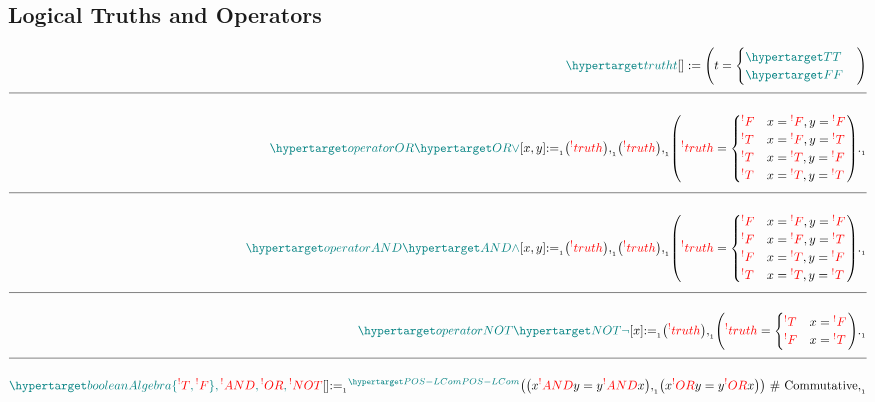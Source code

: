 \documentclass[a4paper]{article}
\makeatletter
\def\ml{\mleft}
\def\mr{\mright}
\newcommand{\defeq}{:=}
\newcommand{\eq}{=}
\newcommand{\cusand}{,}
\newcommand{\cusend}{.}
\newcommand{\cusnum}[2]{{#1}_{{\phantom{ }}_{#2}}}
\newcommand{\eqComment}[1]{\text{  \# #1}}
\newcommand{\n}{\\[1.5ex] \hline \nonumber \\[0ex]}
\newcommand\rfrlist[1]{%
    \forcsvlist{\rfrlist@item}{#1}
}
\newcommand\rfrlist@item[1]{\rfr{#1}\\}
\newcommand{\thmlink}[2]{{}_{\substack{\rfrlist{#1}}}^{\dfn{#2}} }
\makeatother
\begin{document}
\subsection{Logical Truths and Operators}
\begin{tcolorbox}
\begin{align}
     \dfn{truth} [t][] \defeq \ml(t \eq \begin{cases} \dfn{T} \\ \dfn{F} \end{cases}\mr) 
    \n \dfn{operatorOR} [\dfn{OR}[\lor]][x, y] \cusnum{\defeq}{1} \ml(\rfr{truth} [x][]\mr) \cusnum{\cusand}{1} \ml(\rfr{truth} [y][]\mr) \cusnum{\cusand}{1} \ml(\rfr{truth} [x \rfr{OR} y][] \eq \begin{cases} \rfr{F} & x \eq \rfr{F} \cusand y \eq \rfr{F} \\ \rfr{T} & x \eq \rfr{F} \cusand y \eq \rfr{T} \\ \rfr{T} & x \eq \rfr{T} \cusand y \eq \rfr{F} \\ \rfr{T} & x \eq \rfr{T} \cusand y \eq \rfr{T} \end{cases}\mr) \cusnum{\cusend}{1}
    \n \dfn{operatorAND} [\dfn{AND}[\land]][x, y] \cusnum{\defeq}{1} \ml(\rfr{truth} [x][]\mr) \cusnum{\cusand}{1} \ml(\rfr{truth} [y][]\mr) \cusnum{\cusand}{1} \ml(\rfr{truth} [x \rfr{AND} y][] \eq \begin{cases} \rfr{F} & x \eq \rfr{F} \cusand y \eq \rfr{F} \\ \rfr{F} & x \eq \rfr{F} \cusand y \eq \rfr{T} \\ \rfr{F} & x \eq \rfr{T} \cusand y \eq \rfr{F} \\ \rfr{T} & x \eq \rfr{T} \cusand y \eq \rfr{T} \end{cases}\mr) \cusnum{\cusend}{1}
    \n \dfn{operatorNOT} [\dfn{NOT}[\lnot]][x] \cusnum{\defeq}{1} \ml(\rfr{truth} [x][]\mr) \cusnum{\cusand}{1} \ml(\rfr{truth} [\rfr{NOT} x][] \eq \begin{cases} \rfr{T} & x \eq \rfr{F} \\ \rfr{F} & x \eq \rfr{T} \end{cases}\mr) \cusnum{\cusend}{1} 
    \n \dfn{booleanAlgebra} [\{\rfr{T}, \rfr{F}\}, \rfr{AND}, \rfr{OR}, \rfr{NOT}][] \cusnum{\defeq}{1} \thmlink{}{POS-LCom} \ml(\ml(x \rfr{AND} y \eq y \rfr{AND} x\mr) \cusnum{\cusand}{1} \ml(x \rfr{OR} y \eq y \rfr{OR} x\mr)\mr) \eqComment{Commutative} \cusnum{\cusand}{1}

\end{align}
\end{tcolorbox}
\end{document}
